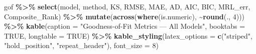 \documentclass[
]{article}
\newenvironment{Shaded}{\begin{snugshade}}{\end{snugshade}}
\newcommand{\AttributeTok}[1]{\textcolor[rgb]{0.13,0.29,0.53}{#1}}
\newcommand{\ConstantTok}[1]{\textcolor[rgb]{0.56,0.35,0.01}{#1}}
\newcommand{\DecValTok}[1]{\textcolor[rgb]{0.00,0.00,0.81}{#1}}
\newcommand{\FunctionTok}[1]{\textcolor[rgb]{0.13,0.29,0.53}{\textbf{#1}}}
\newcommand{\NormalTok}[1]{#1}
\newcommand{\SpecialCharTok}[1]{\textcolor[rgb]{0.81,0.36,0.00}{\textbf{#1}}}
\newcommand{\StringTok}[1]{\textcolor[rgb]{0.31,0.60,0.02}{#1}}
\begin{document}
\begin{Shaded}
\begin{Highlighting}[]
\NormalTok{gof }\SpecialCharTok{\%\textgreater{}\%}
  \FunctionTok{select}\NormalTok{(model, method, KS, RMSE, MAE, AD, AIC, BIC, MRL\_err, Composite\_Rank) }\SpecialCharTok{\%\textgreater{}\%}
  \FunctionTok{mutate}\NormalTok{(}\FunctionTok{across}\NormalTok{(}\FunctionTok{where}\NormalTok{(is.numeric), }\SpecialCharTok{\textasciitilde{}}\FunctionTok{round}\NormalTok{(., }\DecValTok{4}\NormalTok{))) }\SpecialCharTok{\%\textgreater{}\%}
  \FunctionTok{kable}\NormalTok{(}\AttributeTok{caption =} \StringTok{"Goodness{-}of{-}Fit Metrics — All Models"}\NormalTok{,}
        \AttributeTok{booktabs =} \ConstantTok{TRUE}\NormalTok{, }\AttributeTok{longtable =} \ConstantTok{TRUE}\NormalTok{) }\SpecialCharTok{\%\textgreater{}\%}
  \FunctionTok{kable\_styling}\NormalTok{(}\AttributeTok{latex\_options =} \FunctionTok{c}\NormalTok{(}\StringTok{"striped"}\NormalTok{, }\StringTok{"hold\_position"}\NormalTok{, }\StringTok{"repeat\_header"}\NormalTok{),}
                \AttributeTok{font\_size =} \DecValTok{8}\NormalTok{)}
\end{Highlighting}
\end{Shaded}

\begingroup\fontsize{8}{10}\selectfont
\end{document}
